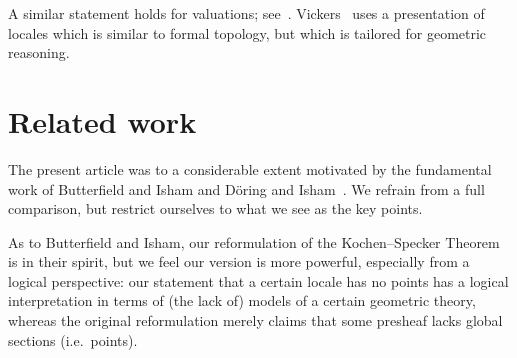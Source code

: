 \documentclass[12pt]{article}
\begin{document}
A similar statement holds for
valuations;
see~\cite{vickersintegration,Coquand/Spitters:integrals-valuations}.
Vickers~\cite{PPExp} uses a presentation of locales which is similar to formal
topology, but which is tailored for geometric reasoning.

\section{Related work}
\label{sec:doringisham}
The present article was to a considerable extent motivated by the fundamental work of 
Butterfield and Isham \cite{butterfieldisham1,butterfieldisham2}
and D\"{o}ring and 
Isham~\cite{doringisham1,doringisham2,doringisham3,doringisham4,doeringisham:review}. We
refrain from a full comparison,  but restrict ourselves to what we see as the  key points.

As to Butterfield and Isham, our reformulation of the Kochen--Specker Theorem is in their spirit, but we feel our version is more powerful, especially from a logical perspective: our statement that a certain locale has no points has a logical interpretation in terms of (the lack of) models of a certain geometric theory, whereas the original reformulation \cite{butterfieldisham1} merely claims that some presheaf lacks global sections (i.e.\ points). 
\end{document}

